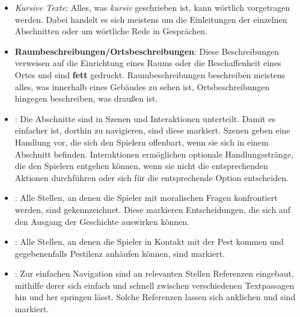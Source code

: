\begin{itemize}
  \item \textit{Kursive Texte}:
  Alles, was \textit{kursiv} geschrieben ist, kann wörtlich vorgetragen werden. Dabei handelt es sich meistens um die Einleitungen der einzelnen Abschnitten oder um wörtliche Rede in Gesprächen.

  \item \textbf{Raumbeschreibungen/Ortsbeschreibungen}:
  Diese Beschreibungen verweisen auf die Einrichtung eines Raums oder die Beschaffenheit eines Ortes und sind \textbf{fett} gedruckt. Raumbeschreibungen beschreiben meistens alles, was innerhalb eines Gebäudes zu sehen ist, Ortsbeschreibungen hingegen beschreiben, was draußen ist.

  \item {}:
  Die Abschnitte sind in Szenen und Interaktionen unterteilt. Damit es einfacher ist, dorthin zu navigieren, sind diese  markiert. Szenen geben eine Handlung vor, die sich den Spielern offenbart, wenn sie sich in einem Abschnitt befinden. Interaktionen ermöglichen optionale Handlungsstränge, die den Spielern entgehen können, wenn sie nicht die entsprechenden Aktionen durchführen oder sich für die entsprechende Option entscheiden.

  \item {}:
  Alle Stellen, an denen die Spieler mit moralischen Fragen konfrontiert werden, sind  gekennzeichnet. Diese markieren Entscheidungen, die sich auf den Ausgang der Geschichte auswirken können.

  \item {}:
  Alle Stellen, an denen die Spieler in Kontakt mit der Pest kommen und gegebenenfalls Pestilenz anhäufen können, sind  markiert.

  \item {}:
  Zur einfachen Navigation sind an relevanten Stellen Referenzen eingebaut, mithilfe derer sich einfach und schnell zwischen verschiedenen Textpassagen hin und her springen lässt. Solche Referenzen lassen sich anklichen und sind  markiert.
\end{itemize}
